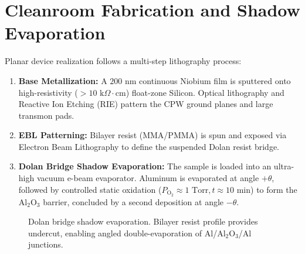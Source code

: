 \documentclass[10pt,journal,compsoc]{IEEEtran}
\begin{document}
\section{Cleanroom Fabrication and Shadow Evaporation}
Planar device realization follows a multi-step lithography process:
\begin{enumerate}
    \item \textbf{Base Metallization:} A $200\text{ nm}$ continuous Niobium film is sputtered onto high-resistivity ($>10\text{ k}\Omega\cdot\text{cm}$) float-zone Silicon. Optical lithography and Reactive Ion Etching (RIE) pattern the CPW ground planes and large transmon pads.
    \item \textbf{EBL Patterning:} Bilayer resist (MMA/PMMA) is spun and exposed via Electron Beam Lithography to define the suspended Dolan resist bridge.
    \item \textbf{Dolan Bridge Shadow Evaporation:} The sample is loaded into an ultra-high vacuum e-beam evaporator. Aluminum is evaporated at angle $+\theta$, followed by controlled static oxidation ($P_{\text{O}_2} \approx 1\text{ Torr}, t \approx 10\text{ min}$) to form the $\text{Al}_2\text{O}_3$ barrier, concluded by a second deposition at angle $-\theta$.
\end{enumerate}

\begin{figure}[!h]
\centering
{}
\caption{Dolan bridge shadow evaporation. Bilayer resist profile provides undercut, enabling angled double-evaporation of Al/$\text{Al}_2\text{O}_3$/Al junctions.}
\label{fig:dolan}
\end{figure}
\end{document}
